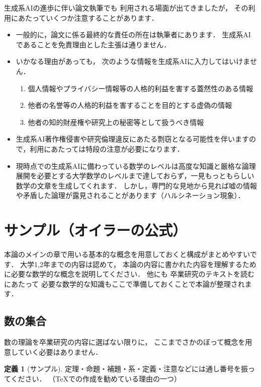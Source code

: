 \documentclass[12pt,a4j,final]{jreport}
\theoremstyle{definition}
\newtheorem{Def}[Thm]{定義}
\begin{document}
生成系AIの進歩に伴い論文執筆でも
利用される場面が出てきましたが，
その利用にあたっていくつか注意することがあります．

\begin{itemize}
\item 一般的に，論文に係る最終的な責任の所在は執筆者にあります．
生成系AIであることを免責理由とした主張は通りません．
\item いかなる理由があっても，
次のような情報を生成系AIに入力してはいけません．
\begin{enumerate}
\item[(1)]個人情報やプライバシー情報等の人格的利益を害する蓋然性のある情報
\item[(2)] 他者の名誉等の人格的利益を害することを目的とする虚偽の情報
\item[(3)] 他者の知的財産権や研究上の秘密等として扱うべき情報
\end{enumerate}
\item 生成系AI著作権侵害や研究倫理違反にあたる剽窃となる可能性を伴いますので，利用にあたっては特段の注意が必要になります．
\item 現時点での生成系AIに備わっている数学のレベルは高度な知識と厳格な論理展開を必要とする大学数学のレベルまで達しておらず，一見もっともらしい数学の文章を生成してくれます．
しかし，専門的な見地から見れば嘘の情報や矛盾した論理が露見されることがあります（ハルシネーション現象）．
\end{itemize}


\section{サンプル（オイラーの公式）}

本論のメインの章で用いる基本的な概念を用意しておくと構成がまとめやすいです．
大学1,2年までの内容は認めて，
本論の内容に書かれた内容を理解するために必要な数学的な概念を説明してください．
他にも
卒業研究のテキストを読むにあたって
必要な数学的な知識もここで準備しておくことで本論が整理されます．

\subsection{数の集合}

数の理論を卒業研究の内容に選ばない限りに，
ここまでさかのぼって概念を用意していく必要はありません．

\begin{Def}[サンプル]\label{Def:sample}
定理・命題・補題・系・定義・注意などには通し番号を振ってください．
（TeXでの作成を勧めている理由の一つ）
\end{Def}
\end{document}
